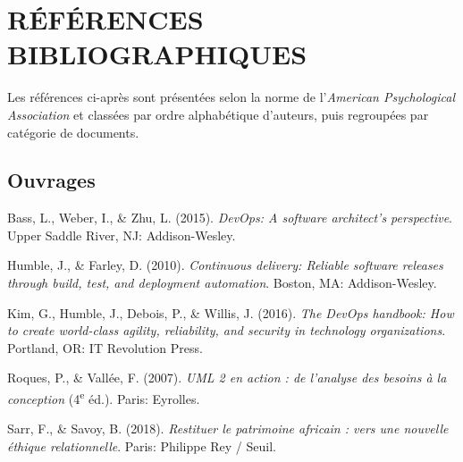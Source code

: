 \cleardoublepage
{}
\chapter*{RÉFÉRENCES BIBLIOGRAPHIQUES}

\newenvironment{apalist}
  {\begin{list}{}{%
     \setlength{\leftmargin}{1.27cm}%
     \setlength{\itemindent}{-1.27cm}%
     \setlength{\listparindent}{0pt}%
     \setlength{\itemsep}{0.55em}%
     \setlength{\parsep}{0pt}%
     \setlength{\topsep}{0.5em}}\sloppy}
  {\end{list}}

Les références ci-après sont présentées selon la norme de l'\emph{American
Psychological Association} et classées par ordre alphabétique d'auteurs, puis
regroupées par catégorie de documents.

\section*{Ouvrages}

\begin{apalist}
\item Bass, L., Weber, I., \& Zhu, L. (2015). \emph{DevOps: A software
      architect's perspective}. Upper Saddle River, NJ: Addison-Wesley.

\item Humble, J., \& Farley, D. (2010). \emph{Continuous delivery: Reliable
      software releases through build, test, and deployment automation}. Boston,
      MA: Addison-Wesley.

\item Kim, G., Humble, J., Debois, P., \& Willis, J. (2016). \emph{The DevOps
      handbook: How to create world-class agility, reliability, and security in
      technology organizations}. Portland, OR: IT Revolution Press.

\item Roques, P., \& Vallée, F. (2007). \emph{UML 2 en action : de l'analyse des
      besoins à la conception} (4\textsuperscript{e} éd.). Paris: Eyrolles.

\item Sarr, F., \& Savoy, B. (2018). \emph{Restituer le patrimoine africain :
      vers une nouvelle éthique relationnelle}. Paris: Philippe Rey / Seuil.
\end{apalist}

